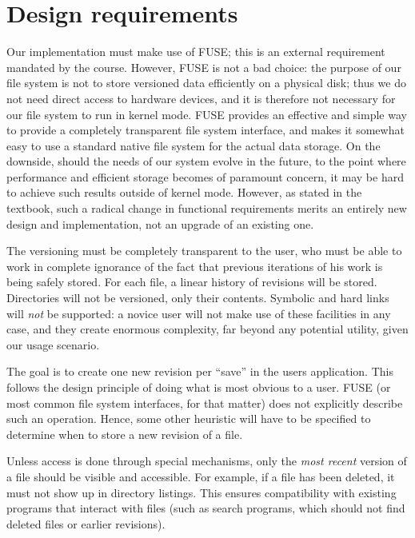 \documentclass[12pt]{article}
\begin{document}
\section{Design requirements}

Our implementation must make use of FUSE; this is an external
requirement mandated by the course.  However, FUSE is not a bad
choice: the purpose of our file system is not to store versioned data
efficiently on a physical disk; thus we do not need direct access to
hardware devices, and it is therefore not necessary for our file
system to run in kernel mode.  FUSE provides an effective and simple
way to provide a completely transparent file system interface, and
makes it somewhat easy to use a standard native file system for the
actual data storage.  On the downside, should the needs of our system
evolve in the future, to the point where performance and efficient
storage becomes of paramount concern, it may be hard to achieve such
results outside of kernel mode.  However, as stated in the textbook,
such a radical change in functional requirements merits an entirely
new design and implementation, not an upgrade of an existing one.

The versioning must be completely transparent to the user, who must be
able to work in complete ignorance of the fact that previous
iterations of his work is being safely stored.  For each file, a
linear history of revisions will be stored.  Directories will not be
versioned, only their contents.  Symbolic and hard links will
\textit{not} be supported: a novice user will not make use of these
facilities in any case, and they create enormous complexity, far
beyond any potential utility, given our usage scenario.

The goal is to create one new revision per ``save'' in the users
application.  This follows the design principle of doing what is most
obvious to a user.  FUSE (or most common file system interfaces, for
that matter) does not explicitly describe such an operation.  Hence,
some other heuristic will have to be specified to determine when to
store a new revision of a file.

Unless access is done through special mechanisms, only the
\textit{most recent} version of a file should be visible and
accessible.  For example, if a file has been deleted, it must not show
up in directory listings.  This ensures compatibility with existing
programs that interact with files (such as search programs, which
should not find deleted files or earlier revisions).
\end{document}
